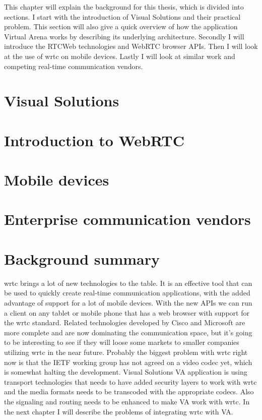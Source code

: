 
This chapter will explain the background for this thesis, which is divided into sections. I start with the introduction of Visual Solutions and their practical problem. This section will also give a quick overview of how the application Virtual Arena works by describing its underlying architecture. Secondly I will introduce the RTCWeb technologies and WebRTC browser APIs. Then I will look at the use of \gls{wrtc} on mobile devices. Lastly I will look at similar work and competing real-time communication vendors.

\section{Visual Solutions}


\newpage
\section{Introduction to WebRTC}


\newpage
\section{Mobile devices}


\newpage
\section{Enterprise communication vendors}


% 

\newpage
\section{Background summary}
\gls{wrtc} brings a lot of new technologies to the table. It is an effective tool that can be used to quickly create real-time communication applications, with the added advantage of support for a lot of mobile devices. With the new APIs we can run a client on any tablet or mobile phone that has a web browser with support for the \gls{wrtc} standard. Related technologies developed by Cisco and Microsoft are more complete and are now dominating the communication space, but it's going to be interesting to see if they will loose some markets to smaller companies utilizing \gls{wrtc} in the near future. Probably the biggest problem with \gls{wrtc} right now is that the IETF working group has not agreed on a video codec yet, which is somewhat halting the development. Visual Solutions VA application is using transport technologies that needs to have added security layers to work with \gls{wrtc} and the media formats needs to be transcoded with the appropriate codecs. Also the signaling and routing needs to be enhanced to make VA work with \gls{wrtc}. In the next chapter I will describe the problems of integrating \gls{wrtc} with VA.

